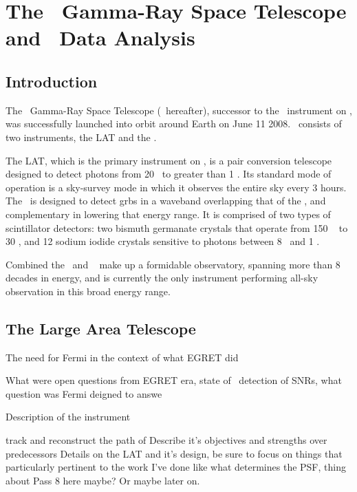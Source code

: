 \chapter{The \Fermi ~Gamma-Ray Space Telescope and \gam ~Data Analysis}
\label{chap:FGST}

\section{\label{FGST:intro}Introduction}
The \Fermi~Gamma-Ray Space Telescope (\Fermi ~hereafter), successor to the \egret~instrument on \cgro, was successfully launched into orbit around Earth on June 11 2008. \Fermi ~consists of two instruments, the LAT and the \gbm.

The LAT, which is the primary instrument on \Fermi, is a pair conversion telescope designed to detect photons from 20 \mev~to greater than 1 \tev. Its standard mode of operation is a sky-survey mode in which it observes the entire sky every 3 hours. The \gbm~is designed to detect \glspl{grb} in a waveband overlapping that of the \lat,  and complementary in lowering that energy range.  It is comprised of two types of scintillator detectors: two bismuth germanate crystals that operate from 150 \kev~ to 30 \mev, and 12 sodium iodide crystals sensitive to photons  between 8 \kev~and 1 \mev. 

Combined the \lat~and \gbm~ make up a formidable observatory, spanning more than 8 decades in energy, and is  currently the only instrument performing all-sky observation in this broad energy range.  


\section{\label{FGST:LAT}The Large Area Telescope}
The need for Fermi in the context of what EGRET did

What were open questions from EGRET era, state of \gam~detection of SNRs, what question was Fermi deigned to answe

Description of the instrument
 
 
 track and reconstruct the path of 
 Describe it's objectives and strengths over predecessors
 Details on the LAT and it's design, be sure to focus on things that particularly pertinent to the work I've done like what determines the PSF, thing about Pass 8 here maybe? Or maybe later on. 
 

